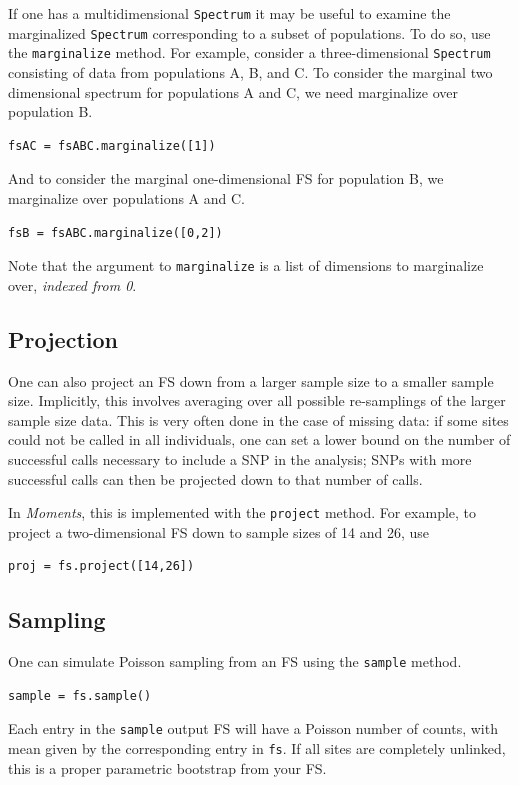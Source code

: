 \documentclass[12pt]{article}
\makeatletter
\newcommand{\py}[1]{\lstinline[language=Python, showstringspaces=False]@#1@}
\makeatother
\begin{document}
If one has a multidimensional \py{Spectrum} it may be useful to examine the marginalized \py{Spectrum} corresponding to a subset of populations.
To do so, use the \py{marginalize} method.
For example, consider a three-dimensional \py{Spectrum} consisting of data from populations A, B, and C.
To consider the marginal two dimensional spectrum for populations A and C, we need marginalize over population B.
\begin{lstlisting}
fsAC = fsABC.marginalize([1])
\end{lstlisting}
And to consider the marginal one-dimensional FS for population B, we marginalize over populations A and C.
\begin{lstlisting}
fsB = fsABC.marginalize([0,2])
\end{lstlisting}
Note that the argument to \py{marginalize} is a list of dimensions to marginalize over, \emph{indexed from 0}.

\subsection{Projection}

One can also project an FS down from a larger sample size to a smaller sample size.
Implicitly, this involves averaging over all possible re-samplings of the larger sample size data.
This is very often done in the case of missing data: if some sites could not be called in all individuals, one can set a lower bound on the number of successful calls necessary to include a SNP in the analysis; SNPs with more successful calls can then be projected down to that number of calls.

In \textit{Moments}, this is implemented with the \py{project} method.
For example, to project a two-dimensional FS down to sample sizes of 14 and 26, use
\begin{lstlisting}
proj = fs.project([14,26])
\end{lstlisting}

\subsection{Sampling}

One can simulate Poisson sampling from an FS using the \py{sample} method.
\begin{lstlisting}
sample = fs.sample()
\end{lstlisting}
Each entry in the \py{sample} output FS will have a Poisson number of counts, with mean given by the corresponding entry in \py{fs}.
If all sites are completely unlinked, this is a proper parametric bootstrap from your FS.
\end{document}
